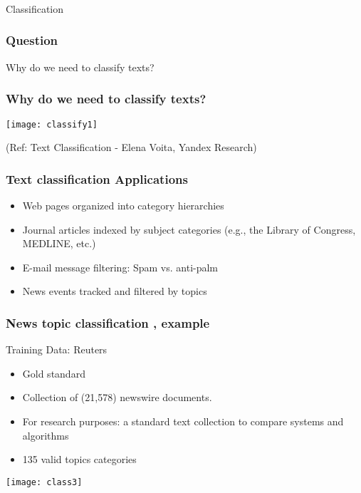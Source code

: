 \begin{frame}[fragile]\frametitle{}

\begin{center}
{\Large Classification}
\end{center}
\end{frame}

\begin{frame}[fragile]
  \frametitle{Question}

Why do we need to classify texts?
\end{frame}

\begin{frame}[fragile]
  \frametitle{Why do we need to classify texts?}
\begin{center}
\texttt{[image: classify1]}
\end{center}

{\tiny (Ref: Text Classification - Elena Voita, Yandex Research)}
\end{frame}


\begin{frame}[fragile]
  \frametitle{Text classification Applications}
\begin{itemize}
\item Web pages organized into category hierarchies
\item Journal articles indexed by subject categories (e.g., the Library of Congress, MEDLINE, etc.)
\item E-mail message filtering: Spam vs. anti-palm
\item News events tracked and filtered by topics
\end{itemize}
\end{frame}

\begin{frame}[fragile]
  \frametitle{News topic classification , example}
Training Data: Reuters
\begin{itemize}
\item Gold standard
\item Collection of (21,578) newswire documents. 
\item For research purposes: a standard text collection to compare systems and algorithms
\item 135 valid topics categories
\end{itemize}
\begin{center}
\texttt{[image: class3]}
\end{center}
\end{frame}

